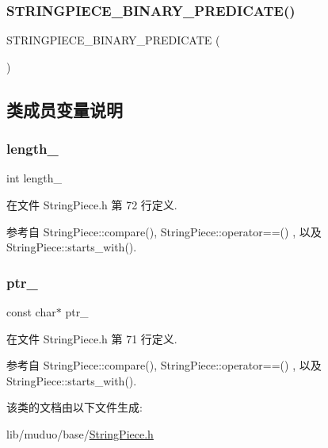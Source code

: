 \subsubsection{\texorpdfstring{S\+T\+R\+I\+N\+G\+P\+I\+E\+C\+E\+\_\+\+B\+I\+N\+A\+R\+Y\+\_\+\+P\+R\+E\+D\+I\+C\+A\+T\+E()}{STRINGPIECE\_BINARY\_PREDICATE()}\hspace{0.1cm}{\footnotesize\ttfamily [4/4]}}
{\footnotesize\ttfamily S\+T\+R\+I\+N\+G\+P\+I\+E\+C\+E\+\_\+\+B\+I\+N\+A\+R\+Y\+\_\+\+P\+R\+E\+D\+I\+C\+A\+TE (\begin{DoxyParamCaption}{ }\end{DoxyParamCaption})}



\subsection{类成员变量说明}
\mbox{\label{classmuduo_1_1StringPiece_a4bac9b810d0cf891c8fcbc974e989739}} 
\subsubsection{\texorpdfstring{length\+\_\+}{length\_}}
{\footnotesize\ttfamily int length\+\_\+\hspace{0.3cm}{\ttfamily [private]}}



在文件 String\+Piece.\+h 第 72 行定义.



参考自 String\+Piece\+::compare(), String\+Piece\+::operator==() , 以及 String\+Piece\+::starts\+\_\+with().

\mbox{\label{classmuduo_1_1StringPiece_a3562ccc1fbaeaf1cb0f2892aa2f299b9}} 
\subsubsection{\texorpdfstring{ptr\+\_\+}{ptr\_}}
{\footnotesize\ttfamily const char$\ast$ ptr\+\_\+\hspace{0.3cm}{\ttfamily [private]}}



在文件 String\+Piece.\+h 第 71 行定义.



参考自 String\+Piece\+::compare(), String\+Piece\+::operator==() , 以及 String\+Piece\+::starts\+\_\+with().



该类的文档由以下文件生成\+:\begin{DoxyCompactItemize}
\item 
lib/muduo/base/\hyperlink{StringPiece_8h}{String\+Piece.\+h}\end{DoxyCompactItemize}
